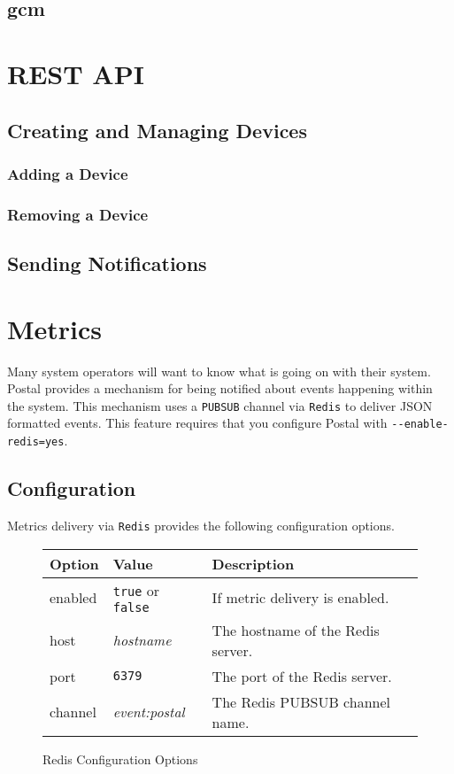 \documentclass[12pt]{article}
\begin{document}
\subsection{gcm}

\section{REST API}

\subsection{Creating and Managing Devices}

\subsubsection{Adding a Device}

\subsubsection{Removing a Device}

\subsection{Sending Notifications}

\section{Metrics}

Many system operators will want to know what is going on with their system.
Postal provides a mechanism for being notified about events happening within the system.
This mechanism uses a \verb|PUBSUB| channel via \verb|Redis| to deliver JSON formatted events.
This feature requires that you configure Postal with \verb|--enable-redis=yes|.

\subsection{Configuration}

Metrics delivery via \verb|Redis| provides the following configuration options.

\begin{figure}[h!]
\centering
\begin{tabular}{l l l}
\hline
Option & Value & Description \\
\hline
enabled & \verb|true| or \verb|false| & If metric delivery is enabled. \\
host & \emph{hostname} & The hostname of the Redis server. \\
port & \verb|6379| & The port of the Redis server. \\
channel & \emph{event:postal} & The Redis PUBSUB channel name. \\
\hline
\end{tabular}
\caption{Redis Configuration Options}
\end{figure}
\end{document}
